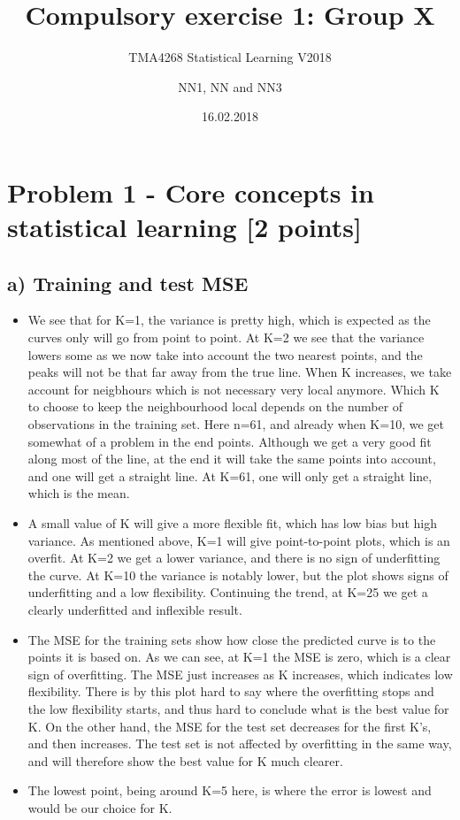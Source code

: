 \documentclass[]{article}
\title{Compulsory exercise 1: Group X}
\subtitle{TMA4268 Statistical Learning V2018}
\author{NN1, NN and NN3}
\date{16.02.2018}
\begin{document}
\maketitle

\section{Problem 1 - Core concepts in statistical learning {[}2
points{]}}\label{problem-1---core-concepts-in-statistical-learning-2-points}

\subsection{a) Training and test MSE}\label{a-training-and-test-mse}

\begin{itemize}
\item
  We see that for K=1, the variance is pretty high, which is expected as
  the curves only will go from point to point. At K=2 we see that the
  variance lowers some as we now take into account the two nearest
  points, and the peaks will not be that far away from the true line.
  When K increases, we take account for neigbhours which is not
  necessary very local anymore. Which K to choose to keep the
  neighbourhood local depends on the number of observations in the
  training set. Here n=61, and already when K=10, we get somewhat of a
  problem in the end points. Although we get a very good fit along most
  of the line, at the end it will take the same points into account, and
  one will get a straight line. At K=61, one will only get a straight
  line, which is the mean.
\item
  A small value of K will give a more flexible fit, which has low bias
  but high variance. As mentioned above, K=1 will give point-to-point
  plots, which is an overfit. At K=2 we get a lower variance, and there
  is no sign of underfitting the curve. At K=10 the variance is notably
  lower, but the plot shows signs of underfitting and a low flexibility.
  Continuing the trend, at K=25 we get a clearly underfitted and
  inflexible result.
\item
  The MSE for the training sets show how close the predicted curve is to
  the points it is based on. As we can see, at K=1 the MSE is zero,
  which is a clear sign of overfitting. The MSE just increases as K
  increases, which indicates low flexibility. There is by this plot hard
  to say where the overfitting stops and the low flexibility starts, and
  thus hard to conclude what is the best value for K. On the other hand,
  the MSE for the test set decreases for the first K's, and then
  increases. The test set is not affected by overfitting in the same
  way, and will therefore show the best value for K much clearer.
\item
  The lowest point, being around K=5 here, is where the error is lowest
  and would be our choice for K.
\end{itemize}
\end{document}

